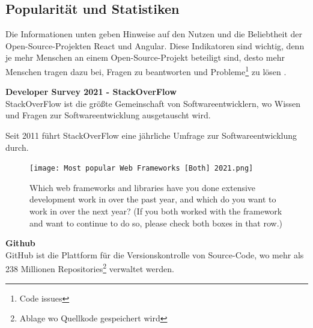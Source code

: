 \newpage
\subsection{Popularität und Statistiken}
Die Informationen unten geben Hinweise auf den Nutzen und die Beliebtheit der Open-Source-Projekten React und Angular.
Diese Indikatoren sind wichtig, denn je mehr Menschen an einem Open-Source-Projekt beteiligt sind, desto mehr Menschen tragen dazu bei, Fragen zu beantworten und Probleme\footnote{Code issues} zu lösen {\cite{LIN1}}.
\begin{flushleft}
  \textbf{Developer Survey 2021 - StackOverFlow}\\
  StackOverFlow ist die größte Gemeinschaft von Softwareentwicklern, wo Wissen und Fragen zur Softwareentwicklung ausgetauscht wird.

  Seit 2011 führt StackOverFlow eine jährliche Umfrage zur Softwareentwicklung durch.

  \begin{figure}[h]
    \centering
    \texttt{[image: Most popular Web Frameworks [Both] 2021.png]}
    \caption{ Which web frameworks and libraries have you done extensive development work in over the past year, and which do you want to work in over the next year? (If you both worked with the framework and want to continue to do so, please check both boxes in that row.) {\cite{SO01}}}

  \end{figure}
\end{flushleft}

\newpage

\begin{flushleft}
  \textbf{Github}\\
  GitHub ist die Plattform für die Versionskontrolle von Source-Code, wo mehr als 238 Millionen Repositories\footnote{Ablage wo Quellkode gespeichert wird} verwaltet werden{\cite{GH07}}.
\end{flushleft}

